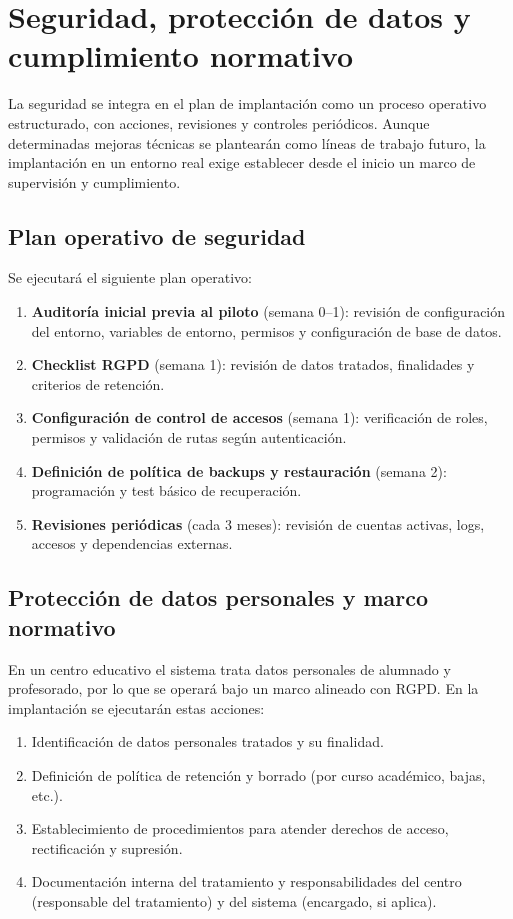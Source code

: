 \section{Seguridad, protección de datos y cumplimiento normativo}
\label{sec:seguridad_implantacion}

La seguridad se integra en el plan de implantación como un proceso operativo estructurado, con acciones, revisiones y controles periódicos. Aunque determinadas mejoras técnicas se plantearán como líneas de trabajo futuro, la implantación en un entorno real exige establecer desde el inicio un marco de supervisión y cumplimiento.

\subsection{Plan operativo de seguridad}

Se ejecutará el siguiente plan operativo:

\begin{enumerate}
    \item \textbf{Auditoría inicial previa al piloto} (semana 0--1): revisión de configuración del entorno, variables de entorno, permisos y configuración de base de datos.
    \item \textbf{Checklist RGPD} (semana 1): revisión de datos tratados, finalidades y criterios de retención.
    \item \textbf{Configuración de control de accesos} (semana 1): verificación de roles, permisos y validación de rutas según autenticación.
    \item \textbf{Definición de política de backups y restauración} (semana 2): programación y test básico de recuperación.
    \item \textbf{Revisiones periódicas} (cada 3 meses): revisión de cuentas activas, logs, accesos y dependencias externas.
\end{enumerate}

\subsection{Protección de datos personales y marco normativo}

En un centro educativo el sistema trata datos personales de alumnado y profesorado, por lo que se operará bajo un marco alineado con RGPD. En la implantación se ejecutarán estas acciones:

\begin{enumerate}
    \item Identificación de datos personales tratados y su finalidad.
    \item Definición de política de retención y borrado (por curso académico, bajas, etc.).
    \item Establecimiento de procedimientos para atender derechos de acceso, rectificación y supresión.
    \item Documentación interna del tratamiento y responsabilidades del centro (responsable del tratamiento) y del sistema (encargado, si aplica).
\end{enumerate}

